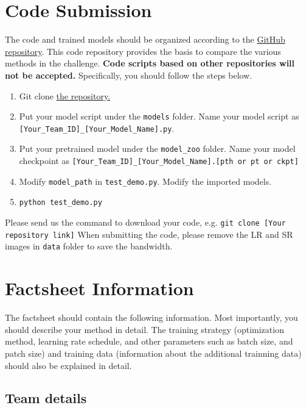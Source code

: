 \documentclass[10pt,twocolumn,letterpaper]{article}
\begin{document}
\section{Code Submission}

The code and trained models should be organized according to the \href{https://github.com/ofsoundof/NTIRE2023_ESR}{GitHub repository}. This code repository provides the basis to compare the various methods in the challenge. \textbf{Code scripts based on other repositories will not be accepted.} Specifically, you should follow the steps below.
\begin{enumerate}
    \item Git clone \href{https://github.com/ofsoundof/NTIRE2023_ESR}{the repository.}
    \item Put your model script under the \texttt{models} folder. Name your model script as \texttt{[Your\_Team\_ID]\_[Your\_Model\_Name].py}.
    \item Put your pretrained model under the \texttt{model\_zoo} folder. Name your model checkpoint as \texttt{[Your\_Team\_ID]\_[Your\_Model\_Name].[pth or pt or ckpt]}
    \item Modify \texttt{model\_path} in \texttt{test\_demo.py}. Modify the imported models.
    \item \texttt{python test\_demo.py}
\end{enumerate}
Please send us the command to download your code, e.g. \texttt{git clone [Your repository link]}
When submitting the code, please remove the LR and SR images in \texttt{data} folder to save the bandwidth.

\section{Factsheet Information}

The factsheet should contain the following information. Most importantly, you should describe your method in detail. The training strategy (optimization method, learning rate schedule, and other parameters such as batch size, and patch size) and training data (information about the additional trainning data) should also be explained in detail.

\subsection{Team details}
\end{document}
